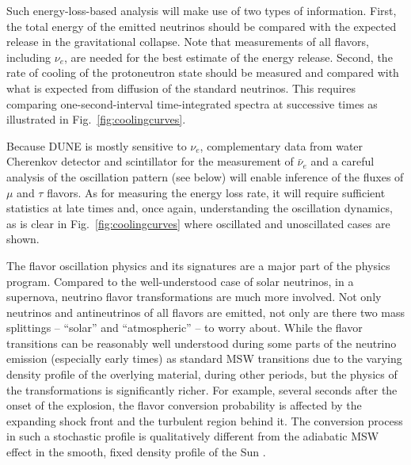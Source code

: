 


Such energy-loss-based analysis will make use of two types of information. First, the total energy of the emitted neutrinos should be compared with the expected release in the gravitational collapse.  Note that measurements of all flavors, including $\nu_e$, are needed for the best estimate of the energy release.
Second, the rate of cooling of the protoneutron state should be measured and compared with what is expected from diffusion of the standard neutrinos. This requires comparing one-second-interval time-integrated spectra at successive times as illustrated in Fig.~\ref{fig:coolingcurves}. 

Because DUNE is mostly sensitive to $\nu_e$, complementary data from water Cherenkov detector and scintillator for the measurement of $\bar\nu_{e}$ and a careful analysis of the oscillation pattern (see below) will enable inference of the fluxes of $\mu$ and $\tau$ flavors. As for measuring the energy loss rate, it will require sufficient statistics at late times and, once again, understanding the oscillation dynamics, as is clear in Fig.~\ref{fig:coolingcurves} where oscillated and unoscillated cases are shown.

The flavor oscillation physics and its signatures are a major part of
the physics program. Compared to the well-understood case of solar
neutrinos, in a supernova, neutrino flavor transformations are much
more involved.  Not only neutrinos and antineutrinos of all flavors
are emitted, not only are there two mass splittings -- ``solar'' and
``atmospheric'' -- to worry about.  While the flavor transitions can
be reasonably well understood during some parts of the neutrino
emission (especially early times) as standard MSW transitions due to the varying density
profile of the overlying material, during other periods,
but the physics of the
transformations is significantly richer.  
For example, several seconds after the onset of the explosion, the
flavor conversion probability is affected by the expanding shock front
and the turbulent region behind it. The conversion process in such a
stochastic profile is qualitatively different from the adiabatic MSW
effect in the smooth, fixed density profile of the Sun . 

